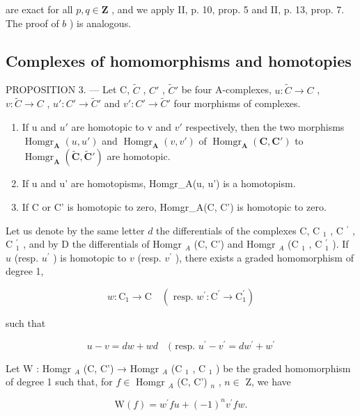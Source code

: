 are exact for all \(p, q \in \mathbf{Z}\) , and we apply II, p. 10, prop. 5 and II, p. 13, prop. 7. The proof of \(b\) ) is analogous.

\subsection{Complexes of homomorphisms and homotopies}

PROPOSITION 3. --- Let C, \(\tilde{C}\) , \(C'\) , \(\tilde{C}'\) be four A-complexes, \(u: \tilde{C} \to C\) , \(v: \tilde{C} \to C\) , \(u': C' \to \tilde{C}'\) and \(v': C' \to \tilde{C}'\) four morphisms of complexes.

\begin{enumerate}
\def\labelenumi{\alph{enumi})}
\item
  If u and \(u'\) are homotopic to v and \(v'\) respectively, then the two morphisms \(\operatorname{Homgr}_{\mathbf{A}}(u, u')\) and \(\operatorname{Homgr}_{\mathbf{A}}(v, v')\) of \(\operatorname{Homgr}_{\mathbf{A}}(\mathbf{C}, \mathbf{C}')\) to \(\operatorname{Homgr}_{\mathbf{A}}(\tilde{\mathbf{C}}, \tilde{\mathbf{C}}')\) are homotopic.
\item
  If u and u' are homotopisms, Homgr\_A(u, u') is a homotopism.
\item
  If C or C' is homotopic to zero, Homgr\_A(C, C') is homotopic to zero.
\end{enumerate}

Let us denote by the same letter \(d\) the differentials of the complexes C, C \(_{1}\) , C \(^{\prime}\) , C \(_{1}^{\prime}\) , and by D the differentials of Homgr \(_{A}\) (C, C') and Homgr \(_{A}\) (C \(_{1}\) , C \(_{1}^{\prime}\) ). If \(u\) (resp. \(u^{\prime}\) ) is homotopic to \(v\) (resp. \(v^{\prime}\) ), there exists a graded homomorphism of degree 1,

\[
w: \mathrm{C} _ {1} \rightarrow \mathrm{C} \quad (\text { resp. } w ^ {\prime}: \mathrm{C} ^ {\prime} \rightarrow \mathrm{C} _ {1} ^ {\prime})
\]

such that

\[
u - v = d w + w d \quad (\text { resp. } u ^ {\prime} - v ^ {\prime} = d w ^ {\prime} + w ^ {\prime}\tag{2}
\]

Let W : Homgr \(_{A}\) (C, C') → Homgr \(_{A}\) (C \(_{1}\) , C \(_{1}\) ) be the graded homomorphism of degree 1 such that, for \(f \in\) Homgr \(_{A}\) (C, C') \(_{n}\) , \(n \in\) Z, we have

\[
\mathrm{W} (f) = w ^ {\prime} f u + (- 1) ^ {n} v ^ {\prime} f w.\tag{3}
\]

